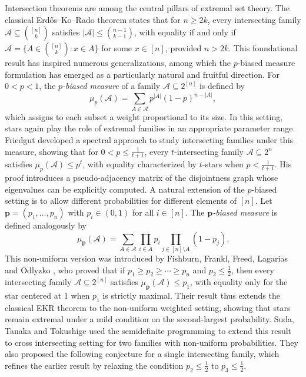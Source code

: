 \documentclass[11pt]{article}
\begin{document}
Intersection theorems are among the central pillars of extremal set theory. The classical Erd\H{o}s--Ko--Rado theorem \cite{E61} states that for $n \ge 2k$, every intersecting family $\mathcal{A} \subseteq \binom{[n]}{k}$ satisfies $|\mathcal{A}| \le \binom{n-1}{k-1}$, with equality if and only if $\mathcal{A}=\big\{A\in \binom{[n]}{k}: x\in A\big\}$ for some $x \in [n]$, provided $n>2k$.
 This foundational result has inspired numerous generalizations, among which the $p$-biased measure formulation has emerged as a particularly natural and fruitful direction. For $0<p<1$, the \textit{$p$-biased measure} of a family $\mathcal{A}\subseteq 2^{[n]}$ is defined by
$$
\mu_p(\mathcal{A}) = \sum_{A\in\mathcal{A}} p^{|A|}(1-p)^{n-|A|},
$$
which assigns to each subset a weight proportional to its size. In this setting, stars again play the role of extremal families in an appropriate parameter range. 
Friedgut \cite{F08} developed a spectral approach to study intersecting families under this measure, showing that for $0<p\le \frac{1}{t+1}$, every $t$-intersecting family $\mathcal{A} \subseteq 2^n$ satisfies $\mu_p(\mathcal{A})\le p^t$, with equality characterized by $t$-stars when $p<\frac{1}{t+1}$. His proof introduces a pseudo-adjacency matrix of the disjointness graph whose eigenvalues can be explicitly computed.
A natural extension of the $p$-biased setting is to allow different probabilities for different elements of $[n]$. Let $\mathbf{p}=(p_1,\dots,p_n)$ with $p_i\in(0,1)$ for all $i\in[n]$. The \textit{$\mathbf{p}$-biased measure} is defined analogously by
$$
\mu_{\mathbf{p}}(\mathcal{A}) = \sum_{A\in\mathcal{A}} \prod_{i\in A} p_i \prod_{j\in [n]\setminus A}(1-p_j).
$$
This non-uniform version was introduced by Fishburn, Frankl, Freed, Lagarias and Odlyzko \cite{F86}, who proved that if $p_1 \ge p_2 \ge \cdots \ge p_n$ and $p_2\le \frac{1}{2}$, then every intersecting family $\mathcal{A} \subseteq 2^{[n]}$ satisfies $\mu_{\mathbf{p}}(\mathcal{A})\le p_1$, with equality only for the star centered at $1$ when $p_1$ is strictly maximal. Their result thus extends the classical EKR theorem to the non-uniform weighted setting, showing that stars remain extremal under a mild condition on the second-largest probability.
Suda,  Tanaka and Tokushige \cite{S17} used the semidefinite programming  to extend this result to cross intersecting setting for two families with non-uniform probabilities.
They also proposed the following conjecture for a single intersecting family, which refines the earlier result by relaxing the condition $p_2\le \frac{1}{2}$ to $p_3\le \frac{1}{2}$.
\end{document}
